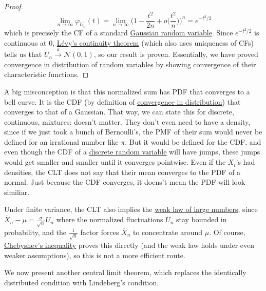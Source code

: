 \begin{proof}
    \begin{equation}
      \lim_{n \rightarrow \infty} \varphi_{U_n} (t) = \lim_{n \rightarrow \infty} \Big( 1 - \frac{t^2}{2n} + o \big( \frac{t^2}{n} \big) \Big)^n = e^{-t^2 / 2}
    \end{equation}
    which is precisely the CF of a standard \hyperref[def:gaussian-random-variable]{Gaussian random variable}. Since $e^{-t^2/2}$ is continuous at $0$, \hyperref[thm:levy-continuity-theorem]{L\'evy's continuity theorem} (which also uses uniqueness of CFs) tells us that $U_n \xrightarrow{d} \mathcal{N}(0, 1)$, so our result is proven. Essentially, we have proved \hyperref[def:convergence-in-distribution]{convergence in distribution} of \hyperref[def:random-variable]{random variables} by showing convergence of their characteristic functions. 
  \end{proof}

  A big misconception is that this normalized sum has PDF that converges to a bell curve. It is the CDF (by definition of \hyperref[def:convergence-in-distribution]{convergence in distribution}) that converges to that of a Gaussian. That way, we can state this for discrete, continuous, mixtures: doesn't matter. They don't even need to have a density, since if we just took a bunch of Bernoulli's, the PMF of their sum would never be defined for an irrational number like $\pi$. But it would be defined for the CDF, and even though the CDF of a \hyperref[def:discrete-random-variable]{discrete random variable} will have jumps, these jumps would get smaller and smaller until it converges pointwise. Even if the $X_i$'s had densities, the CLT does not say that their mean converges to the PDF of a normal. Just because the CDF converges, it doens't mean the PDF will look similiar. 

  Under finite variance, the CLT also implies the \hyperref[thm:weak-law-of-large-numbers]{weak law of large numbers}, since $\overline{X}_n - \mu = \frac{\sigma}{\sqrt{n}} U_n$ where the normalized fluctuations $U_n$ stay bounded in probability, and the $\frac{1}{\sqrt{n}}$ factor forces $\overline{X}_n$ to concentrate around $\mu$. Of course, \hyperref[thm:chebyshev-inequality]{Chebyshev's inequality} proves this directly (and the weak law holds under even weaker assumptions), so this is not a more efficient route. 

	We now present another central limit theorem, which replaces the identically distributed condition with Lindeberg's condition. 

